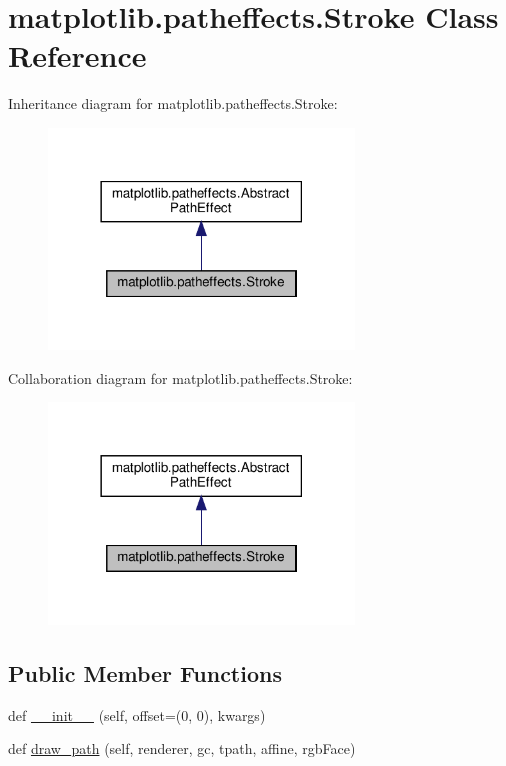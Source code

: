\hypertarget{classmatplotlib_1_1patheffects_1_1Stroke}{}\section{matplotlib.\+patheffects.\+Stroke Class Reference}
\label{classmatplotlib_1_1patheffects_1_1Stroke}


Inheritance diagram for matplotlib.\+patheffects.\+Stroke\+:
\nopagebreak
\begin{figure}[H]
\begin{center}
\leavevmode
\includegraphics[width=230pt]{classmatplotlib_1_1patheffects_1_1Stroke__inherit__graph}
\end{center}
\end{figure}


Collaboration diagram for matplotlib.\+patheffects.\+Stroke\+:
\nopagebreak
\begin{figure}[H]
\begin{center}
\leavevmode
\includegraphics[width=230pt]{classmatplotlib_1_1patheffects_1_1Stroke__coll__graph}
\end{center}
\end{figure}
\subsection*{Public Member Functions}
\begin{DoxyCompactItemize}
\item 
def \hyperlink{classmatplotlib_1_1patheffects_1_1Stroke_a6c6c748a654ffe38c0163392bb1dfe82}{\+\_\+\+\_\+init\+\_\+\+\_\+} (self, offset=(0, 0), kwargs)
\item 
def \hyperlink{classmatplotlib_1_1patheffects_1_1Stroke_aeb4f865ce65e6e4a625b4ca0e29c6b61}{draw\+\_\+path} (self, renderer, gc, tpath, affine, rgb\+Face)
\end{DoxyCompactItemize}


